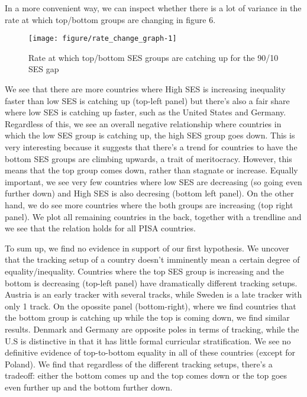 \documentclass[11pt, a4paper]{article}\usepackage[]{graphicx}\usepackage[]{color}
\begin{document}
In a more convenient way, we can inspect whether there is a lot of variance in the rate at which top/bottom groups are changing in figure 6.



\begin{figure}

{\centering \texttt{[image: figure/rate\_change\_graph-1]} 

}

\caption[Rate at which top/bottom SES groups are catching up for the 90/10 SES gap]{Rate at which top/bottom SES groups are catching up for the 90/10 SES gap}\label{fig:rate_change_graph}
\end{figure}



We see that there are more countries where High SES is increasing inequality faster than low SES is catching up (top-left panel) but there's also a fair share where low SES is catching up faster, such as the United States and Germany. Regardless of this, we see an overall negative relationship where countries in which the low SES group is catching up, the high SES group goes down. This is very interesting because it suggests that there's a trend for countries to have the bottom SES groups are climbing upwards, a trait of meritocracy. However, this means that the top group comes down, rather than stagnate or increase. Equally important, we see very few countries where low SES are decreasing (so going even further down) and High SES is also decresing (bottom left panel). On the other hand, we do see more countries where the both groups are increasing (top right panel). We plot all remaining countries in the back, together with a trendline and we see that the relation holds for all PISA countries.

To sum up, we find no evidence in support of our first hypothesis. We uncover that the tracking setup of a country doesn't imminently mean a certain degree of equality/inequality. Countries where the top SES group is increasing and the bottom is decreasing (top-left panel) have dramatically different tracking setups. Austria is an early tracker with several tracks, while Sweden is a late tracker with only 1 track. On the opossite panel (bottom-right), where we find countries that the bottom group is catching up while the top is coming down, we find similar results. Denmark and Germany are opposite poles in terms of tracking, while the U.S is distinctive in that it has little formal curricular stratification. We see no definitive evidence of top-to-bottom equality in all of these countries (except for Poland). We find that regardless of the different tracking setups, there's a tradeoff: either the bottom comes up and the top comes down or the top goes even further up and the bottom further down.
\end{document}
